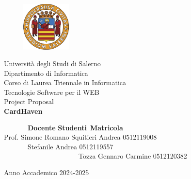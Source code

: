 \documentclass[14pt]{extreport}
\begin{document}

\begin{titlepage}
\begin{center}
	\begin{figure}
    	\includegraphics[width=2.5cm, height=2.5cm]{unisa.png}
    	\centering
    \end{figure}
	{\Large Università degli Studi di Salerno}\\[0.2truecm]
	{\large Dipartimento di Informatica\\Corso di Laurea Triennale in Informatica}\\
	\hrulefill
	\vfill
	{\large Tecnologie Software per il WEB}\\[0.2truecm]
    {\large Project Proposal}\\[0.2truecm]
	\vfill\vfill
	{\LARGE {\bf CardHaven}}
	
	\vfill\vfill
	
	
	\ \ \ \ \ \ \ {\bf Docente} \hfill {\bf Studenti}\ \hfill  {\bf Matricola}\  \\
	Prof.  Simone Romano \hfill Squitieri Andrea \hfill 0512119008 \\
    \ \ \ \ \ \ \ \hfill \hfill \hfill Stefanile Andrea \hfill 0512119557 \\
    \ \ \ \ \ \ \ \ \ \ \ \ \ \ \ \ \ \ \ \ \ \ \hfill \hfill \hfill \hfill \hfill \hfill \hfill \hfill \hfill \hfill \hfill Tozza Gennaro Carmine \hfill 0512120382 \\
	\vfill
	\hrulefill 
	\begin{center} Anno Accademico 2024-2025 \end{center}
	
\end{center}
\end{titlepage}

\tableofcontents
\end{document}
